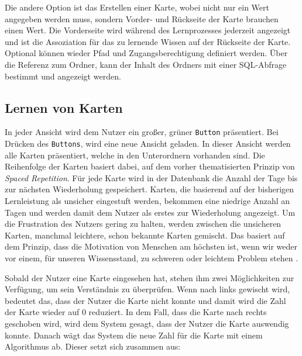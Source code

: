 Die andere Option ist das Erstellen einer Karte, wobei nicht nur ein Wert angegeben werden muss, sondern Vorder- und Rückseite der Karte brauchen einen Wert. Die Vorderseite wird während des Lernprozesses jederzeit angezeigt und ist die Assoziation für das zu lernende Wissen auf der Rückseite der Karte. Optional können wieder Pfad und Zugangsberechtigung definiert werden. Über die Referenz zum Ordner, kann der Inhalt des Ordners mit einer SQL-Abfrage bestimmt und angezeigt werden.

\subsection{Lernen von Karten}
In jeder Ansicht wird dem Nutzer ein großer, grüner \texttt{Button} präsentiert. Bei Drücken des \texttt{Buttons}, wird eine neue Ansicht geladen. In dieser Ansicht werden alle Karten präsentiert, welche in den Unterordnern vorhanden sind. Die Reihenfolge der Karten basiert dabei, auf dem vorher thematisierten Prinzip von \textit{Spaced Repetition}. Für jede Karte wird in der Datenbank die Anzahl der Tage bis zur nächsten Wiederholung gespeichert. Karten, die basierend auf der bisherigen Lernleistung als unsicher eingestuft werden, bekommen eine niedrige Anzahl an Tagen und werden damit dem Nutzer als erstes zur Wiederholung angezeigt. Um die Frustration des Nutzers gering zu halten, werden zwischen die unsicheren Karten, manchmal leichtere, schon bekannte Karten gemischt. Das basiert auf dem Prinzip, dass die Motivation von Menschen am höchsten ist, wenn wir weder vor einem, für unseren Wissensstand, zu schweren oder leichtem Problem stehen \cite{AtomicHabits}.

Sobald der Nutzer eine Karte eingesehen hat, stehen ihm zwei Möglichkeiten zur Verfügung, um sein Verständnis zu überprüfen. Wenn nach links gewischt wird, bedeutet das, dass der Nutzer die Karte nicht konnte und damit wird die Zahl der Karte wieder auf 0 reduziert. In dem Fall, dass die Karte nach rechts geschoben wird, wird dem System gesagt, dass der Nutzer die Karte auswendig konnte. Danach wägt das System die neue Zahl für die Karte mit einem Algorithmus ab. Dieser setzt sich zusammen aus:

